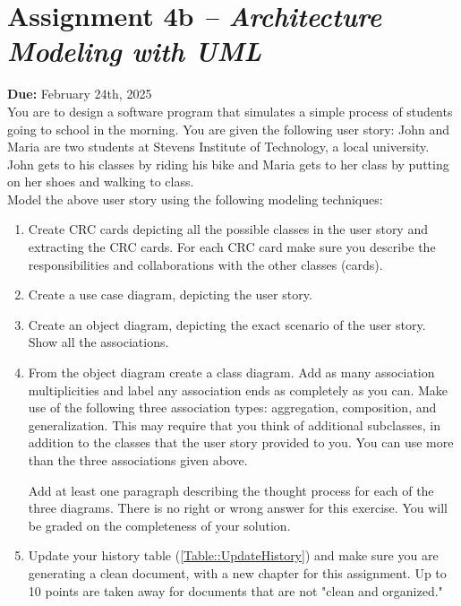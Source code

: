 \section{Assignment 4b \textit{-- Architecture Modeling with UML}}\label{Assignments::4b}
\textbf{Due:} February 24th, 2025 \\

\noindent
You are to design a software program that simulates a simple process of students going to school in the morning. You are given the following user story: John and Maria are two students at Stevens Institute of Technology, a local university. John gets to his classes by riding his bike and Maria gets to her class by putting on her shoes and walking to class. \\

\noindent
Model the above user story using the following modeling techniques:

\begin{enumerate}
    \item Create CRC cards depicting all the possible classes in the user story and extracting the CRC cards. For each CRC card make sure you describe the responsibilities and collaborations with the other classes (cards).
    \item Create a use case diagram, depicting the user story.
    \item Create an object diagram, depicting the exact scenario of the user story. Show all the associations.
    \item From the object diagram create a class diagram. Add as many association multiplicities and label any association ends as completely as you can. Make use of the following three association types: aggregation, composition, and generalization. This may require that you think of additional subclasses, in addition to the classes that the user story provided to you. You can use more than the three associations given above.

    Add at least one paragraph describing the thought process for each of the three diagrams. There is no right or wrong answer for this exercise. You will be graded on the completeness of your solution.
    \item Update your history table (\ref{Table::UpdateHistory}) and make sure you are generating a clean document, with a new chapter for this assignment. Up to 10 points are taken away for documents that are not "clean and organized."
\end{enumerate}